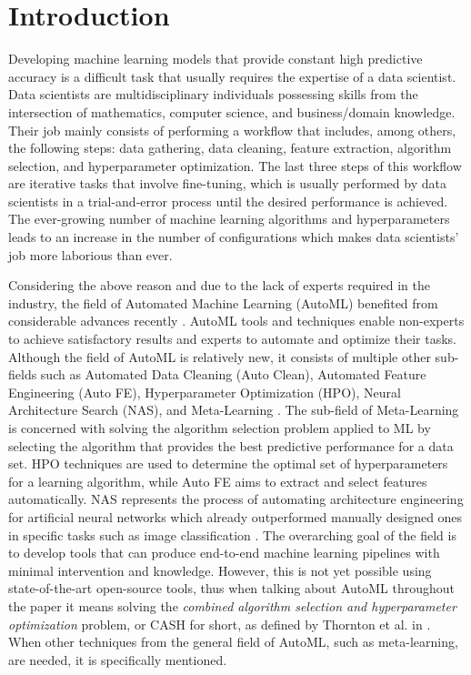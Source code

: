 \documentclass{sig-alternate-br}
\begin{document}
\section{Introduction}
Developing machine learning models that provide constant high predictive accuracy is a difficult task that usually requires the expertise of a data scientist. Data scientists are multidisciplinary individuals possessing skills from the intersection of mathematics, computer science, and business/domain knowledge. Their job mainly consists of performing a workflow that includes, among others, the following steps: data gathering, data cleaning, feature extraction, algorithm selection, and hyperparameter optimization. The last three steps of this workflow are iterative tasks that involve fine-tuning, which is usually performed by data scientists in a trial-and-error process until the desired performance is achieved. The ever-growing number of machine learning algorithms and hyperparameters leads to an increase in the number of configurations which makes data scientists' job more laborious than ever. 

Considering the above reason and due to the lack of experts required in the industry, the field of Automated Machine Learning (AutoML) benefited from considerable advances recently \cite{elshawi2019automated}. AutoML tools and techniques enable non-experts to achieve satisfactory results and experts to automate and optimize their tasks. Although the field of AutoML is relatively new, it consists of multiple other sub-fields such as Automated Data Cleaning (Auto Clean), Automated Feature Engineering (Auto FE), Hyperparameter Optimization (HPO), Neural Architecture Search (NAS), and Meta-Learning \cite{zoller2019survey}. The sub-field of Meta-Learning is concerned with solving the algorithm selection problem \cite{rice1976algorithm} applied to ML by selecting the algorithm that provides the best predictive performance for a data set. HPO techniques are used to determine the optimal set of hyperparameters for a learning algorithm, while Auto FE aims to extract and select features automatically. NAS represents the process of automating architecture engineering for artificial neural networks which already outperformed manually designed ones in specific tasks such as image classification \cite{elsken2018neural}. The overarching goal of the field is to develop tools that can produce end-to-end machine learning pipelines with minimal intervention and knowledge. However, this is not yet possible using state-of-the-art open-source tools, thus when talking about AutoML throughout the paper it means solving the \textit{combined algorithm selection and hyperparameter optimization} problem, or CASH for short, as defined by Thornton et al. in \cite{thornton2013autoweka}. When other techniques from the general field of AutoML, such as meta-learning, are needed, it is specifically mentioned.
\end{document}
